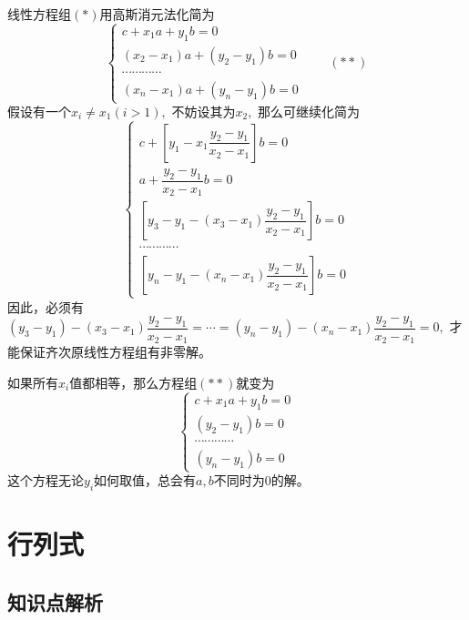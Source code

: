 \documentclass[a4paper]{book}
\begin{document}
线性方程组$(\ast)$用高斯消元法化简为
$$\begin{cases} c + x_1a + y_1b = 0 \\ (x_2-x_1)a + (y_2-y_1)b = 0 \\ \cdots\cdots\cdots\cdots \\ (x_n-x_1)a + (y_n-y_1)b = 0 \end{cases} \qquad (\ast\ast)$$
假设有一个$x_i \neq x_1 (i > 1),$ 不妨设其为$x_2,$ 那么可继续化简为
$$\begin{cases} c + \left[ y_1 - x_1\dfrac{y_2-y_1}{x_2-x_1} \right] b = 0 \\ a + \dfrac{y_2-y_1}{x_2-x_1}b = 0 \\ \left[ y_3-y_1 - (x_3-x_1)\dfrac{y_2-y_1}{x_2-x_1} \right] b = 0 \\ \cdots\cdots\cdots\cdots \\ \left[ y_n-y_1 - (x_n-x_1)\dfrac{y_2-y_1}{x_2-x_1} \right] b = 0 \end{cases}$$
因此，必须有$(y_3-y_1) - (x_3-x_1)\dfrac{y_2-y_1}{x_2-x_1} = \cdots = (y_n-y_1) - (x_n-x_1)\dfrac{y_2-y_1}{x_2-x_1} = 0,$ 才能保证齐次原线性方程组有非零解。

如果所有$x_i$值都相等，那么方程组$(\ast\ast)$就变为
$$\begin{cases} c + x_1a + y_1b = 0 \\ (y_2-y_1)b = 0 \\ \cdots\cdots\cdots\cdots \\ (y_n-y_1)b = 0 \end{cases}$$
这个方程无论$y_i$如何取值，总会有$a,b$不同时为0的解。


\chapter{行列式}

\section{知识点解析}
\end{document}
